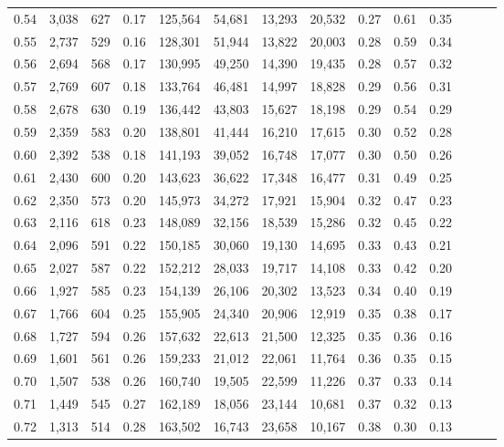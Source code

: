 \begin{tabular}{rrrrrrrrrrrrrr}
0.54 &  3,038 &    627 &  0.17 &  125,564 &   54,681 &  13,293 &  20,532 &  0.27 &  0.61 &      0.35 \\
0.55 &  2,737 &    529 &  0.16 &  128,301 &   51,944 &  13,822 &  20,003 &  0.28 &  0.59 &      0.34 \\
0.56 &  2,694 &    568 &  0.17 &  130,995 &   49,250 &  14,390 &  19,435 &  0.28 &  0.57 &      0.32 \\
0.57 &  2,769 &    607 &  0.18 &  133,764 &   46,481 &  14,997 &  18,828 &  0.29 &  0.56 &      0.31 \\
0.58 &  2,678 &    630 &  0.19 &  136,442 &   43,803 &  15,627 &  18,198 &  0.29 &  0.54 &      0.29 \\
0.59 &  2,359 &    583 &  0.20 &  138,801 &   41,444 &  16,210 &  17,615 &  0.30 &  0.52 &      0.28 \\
0.60 &  2,392 &    538 &  0.18 &  141,193 &   39,052 &  16,748 &  17,077 &  0.30 &  0.50 &      0.26 \\
0.61 &  2,430 &    600 &  0.20 &  143,623 &   36,622 &  17,348 &  16,477 &  0.31 &  0.49 &      0.25 \\
0.62 &  2,350 &    573 &  0.20 &  145,973 &   34,272 &  17,921 &  15,904 &  0.32 &  0.47 &      0.23 \\
0.63 &  2,116 &    618 &  0.23 &  148,089 &   32,156 &  18,539 &  15,286 &  0.32 &  0.45 &      0.22 \\
0.64 &  2,096 &    591 &  0.22 &  150,185 &   30,060 &  19,130 &  14,695 &  0.33 &  0.43 &      0.21 \\
0.65 &  2,027 &    587 &  0.22 &  152,212 &   28,033 &  19,717 &  14,108 &  0.33 &  0.42 &      0.20 \\
0.66 &  1,927 &    585 &  0.23 &  154,139 &   26,106 &  20,302 &  13,523 &  0.34 &  0.40 &      0.19 \\
0.67 &  1,766 &    604 &  0.25 &  155,905 &   24,340 &  20,906 &  12,919 &  0.35 &  0.38 &      0.17 \\
0.68 &  1,727 &    594 &  0.26 &  157,632 &   22,613 &  21,500 &  12,325 &  0.35 &  0.36 &      0.16 \\
0.69 &  1,601 &    561 &  0.26 &  159,233 &   21,012 &  22,061 &  11,764 &  0.36 &  0.35 &      0.15 \\
0.70 &  1,507 &    538 &  0.26 &  160,740 &   19,505 &  22,599 &  11,226 &  0.37 &  0.33 &      0.14 \\
0.71 &  1,449 &    545 &  0.27 &  162,189 &   18,056 &  23,144 &  10,681 &  0.37 &  0.32 &      0.13 \\
0.72 &  1,313 &    514 &  0.28 &  163,502 &   16,743 &  23,658 &  10,167 &  0.38 &  0.30 &      0.13 \\

\end{tabular}
